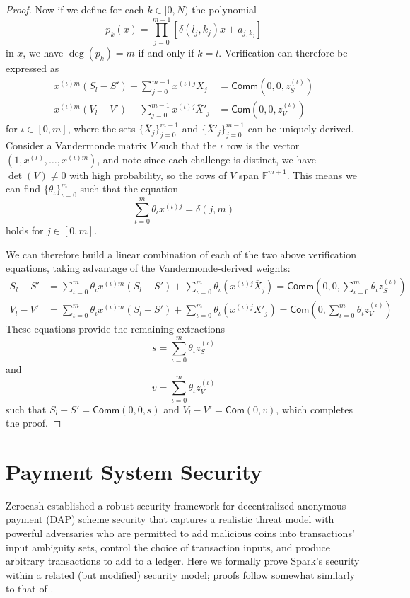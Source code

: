 \documentclass{llncs}
\newcommand{\F}{\mathbb{F}}
\newcommand{\func}[1]{\mathsf{#1}}
\newcommand{\com}{\func{Com}}
\newcommand{\comm}{\func{Comm}}
\begin{document}
\begin{proof}
    Now if we define for each $k \in [0,N)$ the polynomial
    $$p_k(x) = \prod_{j=0}^{m-1} \left[ \delta(l_j,k_j)x + a_{j,k_j} \right]$$
    in $x$, we have $\deg(p_k) = m$ if and only if $k = l$.
    Verification can therefore be expressed as
    \begin{align*}
        x^{(\iota)m}(S_l - S') - \sum_{j=0}^{m-1} x^{(\iota)j} \overline{X}_j &= \comm(0,0,z_S^{(\iota)}) \\
        x^{(\iota)m}(V_l - V') - \sum_{j=0}^{m-1} x^{(\iota)j} \overline{X}'_j &= \com(0,0,z_V^{(\iota)})
    \end{align*}
    for $\iota \in [0,m]$, where the sets $\{\overline{X}_j\}_{j=0}^{m-1}$ and $\{\overline{X}'_j\}_{j=0}^{m-1}$ can be uniquely derived.
    Consider a Vandermonde matrix $V$ such that the $\iota$ row is the vector $(1, x^{(\iota)}, \ldots, x^{(\iota)m})$, and note since each challenge is distinct, we have $\det(V) \neq 0$ with high probability, so the rows of $V$ span $\F^{m+1}$.
    This means we can find $\{\theta_\iota\}_{\iota=0}^m$ such that the equation
    $$\sum_{\iota=0}^m \theta_\iota x^{(\iota)j} = \delta(j,m)$$
    holds for $j \in [0,m]$.

    We can therefore build a linear combination of each of the two above verification equations, taking advantage of the Vandermonde-derived weights:
    \begin{align*}
        S_l - S' &= \sum_{\iota=0}^m \theta_\iota x^{(\iota)m}(S_l - S') + \sum_{\iota=0}^m \theta_\iota \left(x^{(\iota)j}\overline{X}_j\right) = \comm\left(0, 0, \sum_{\iota=0}^m \theta_\iota z_S^{(\iota)}\right) \\
        V_l - V' &= \sum_{\iota=0}^m \theta_\iota x^{(\iota)m}(S_l - S') + \sum_{\iota=0}^m \theta_\iota \left(x^{(\iota)j}\overline{X}'_j\right) = \com\left(0, \sum_{\iota=0}^m \theta_\iota z_V^{(\iota)}\right)
    \end{align*}
    These equations provide the remaining extractions
    $$s = \sum_{\iota=0}^m \theta_\iota z_S^{(\iota)}$$
    and
    $$v = \sum_{\iota=0}^m \theta_\iota z_V^{(\iota)}$$
    such that $S_l - S' = \comm(0,0,s)$ and $V_l - V' = \com(0,v)$, which completes the proof.
\end{proof}

\section{Payment System Security}
\label{app:security}
 
Zerocash \cite{zerocash} established a robust security framework for decentralized anonymous payment (DAP) scheme security that captures a realistic threat model with powerful adversaries who are permitted to add malicious coins into transactions' input ambiguity sets, control the choice of transaction inputs, and produce arbitrary transactions to add to a ledger.
Here we formally prove Spark's security within a related (but modified) security model; proofs follow somewhat similarly to that of \cite{zerocash}.
\end{document}
